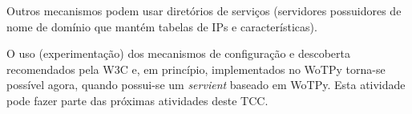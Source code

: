 Outros mecanismos podem usar diretórios de serviços (servidores possuidores de nome de domínio que mantém tabelas de IPs e características).

O uso (experimentação) dos mecanismos de configuração e descoberta recomendados pela W3C e, em princípio, implementados no WoTPy torna-se possível agora, quando possui-se um \textit{servient} baseado em WoTPy. Esta atividade pode fazer parte das próximas atividades deste TCC. 

